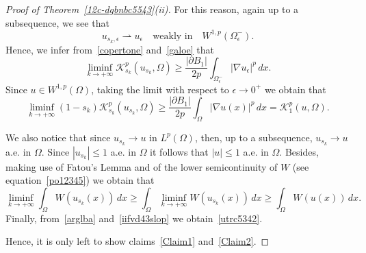 \documentclass[12pt]{article}
\numberwithin{equation}{section}
\renewcommand{\leq}{\leqslant}
\renewcommand{\geq}{\geqslant}
\begin{document}
\begin{proof}[Proof of Theorem~\ref{12c-dgbnbc5543}(ii)]
For this reason, again up to a subsequence, we see that
\begin{equation}\label{galoe}
u_{s_k,\epsilon}\rightharpoonup u_{\epsilon} \quad\mbox{weakly in}\quad W^{1,p}(\Omega_{\epsilon}^{-}).  
\end{equation} 
Hence, we infer from~\eqref{copertone} and~\eqref{galoe} that 
\begin{equation*}
\liminf_{k\to +\infty} \mathcal{K}_{s_k}^p(u_{s_k},\Omega)\geq \frac{\left|\partial B_1\right|}{2p}\int_{\Omega_{\epsilon}^{-}}\left|\nabla u_{\epsilon}\right|^p\,dx. 
\end{equation*}
Since $u\in W^{1,p}(\Omega)$, taking the limit with respect to $\epsilon\to 0^+$ we obtain that 
\begin{equation}\label{arglba}
\liminf_{k\to +\infty}(1-s_k) \mathcal{K}_{s_k}^p(u_{s_k},\Omega)\geq\frac{\left|\partial B_1\right|}{2p}\int_{\Omega}\left|\nabla u(x)\right|^p\,dx=\mathcal{K}_1^p(u,\Omega).
\end{equation} 

We also notice that since $u_{s_k}\to u$ in $L^p(\Omega)$, then, up to a subsequence,
$u_{s_k}\to u$ a.e. in $\Omega$. Since $\left|u_{s_k}\right|\leq 1$ a.e. in $\Omega$ it follows that $\left|u\right|\leq 1$ a.e. in $\Omega$. Besides, making use of Fatou's Lemma and of
the lower semicontinuity of $W$ (see equation~\eqref{po12345}) we obtain that
\begin{equation}\label{iifvd43slop}
\liminf_{k\to +\infty}\int_{\Omega} W(u_{s_k}(x))\,dx\geq \int_{\Omega} \liminf_{k\to +\infty} W(u_{s_k}(x))\,dx\geq \int_{\Omega} W(u(x))\,dx.  
\end{equation}
Finally, from~\eqref{arglba} and~\eqref{iifvd43slop} we obtain~\eqref{utrc5342}. 

Hence, it is only left to show claims~\eqref{Claim1} and~\eqref{Claim2}.


\end{proof}
\end{document}
